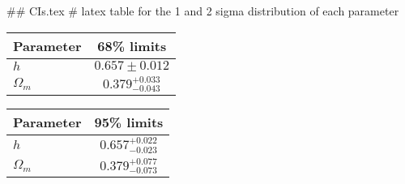 ## CIs.tex
# latex table for the 1 and 2 sigma distribution of each parameter

\begin{tabular} { l  c}
 Parameter &  68\% limits\\
\hline
{\boldmath$h              $} & $0.657\pm 0.012            $\\
{\boldmath$\Omega_m       $} & $0.379^{+0.033}_{-0.043}   $\\
\hline
\end{tabular}

\begin{tabular} { l  c}
 Parameter &  95\% limits\\
\hline
{\boldmath$h              $} & $0.657^{+0.022}_{-0.023}   $\\
{\boldmath$\Omega_m       $} & $0.379^{+0.077}_{-0.073}   $\\
\hline
\end{tabular}
